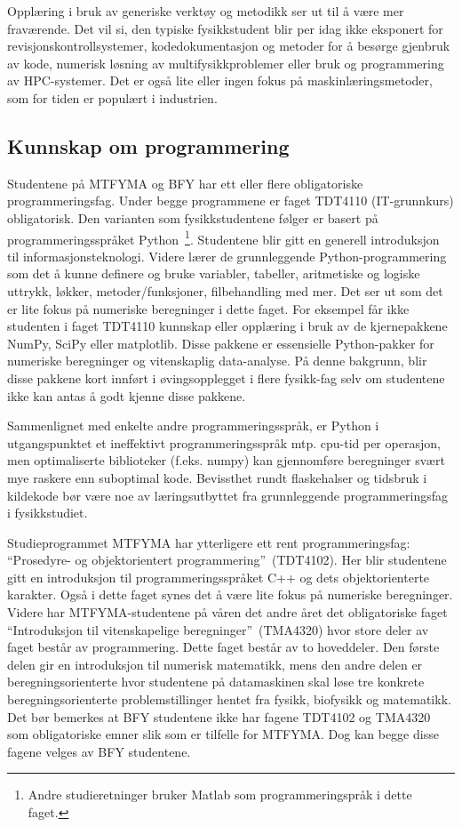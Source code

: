 \documentclass{article}
\begin{document}
Opplæring i bruk av generiske verktøy og metodikk ser ut til å være mer fraværende. Det vil si, den typiske fysikkstudent blir per idag ikke eksponert for revisjonskontrollsystemer, kodedokumentasjon og metoder for å besørge gjenbruk av kode, numerisk løsning av multifysikkproblemer eller bruk og programmering av HPC-systemer. Det er også lite eller ingen fokus på maskinlæringsmetoder, som for tiden er populært i industrien.

\subsection{Kunnskap om programmering}
\label{Sec:Programming}
Studentene på MTFYMA og BFY har ett eller flere obligatoriske programmeringsfag. Under begge programmene er faget TDT4110 (IT-grunnkurs) obligatorisk. Den varianten som fysikkstudentene følger er basert på programmeringsspråket Python~\footnote{Andre studieretninger bruker Matlab som programmeringspråk i dette faget.}. Studentene blir gitt en generell introduksjon til informasjonsteknologi. Videre lærer de grunnleggende Python-programmering som det å kunne definere og bruke variabler, tabeller, aritmetiske og logiske uttrykk, løkker, metoder/funksjoner, filbehandling med mer. Det ser ut som det er lite fokus på numeriske beregninger i dette faget. For eksempel får ikke studenten i faget TDT4110 kunnskap eller opplæring i bruk av de kjernepakkene NumPy, SciPy eller matplotlib. Disse pakkene er essensielle Python-pakker for numeriske beregninger og vitenskaplig data-analyse. På denne bakgrunn, blir disse pakkene kort innført i øvingsopplegget i flere fysikk-fag selv om studentene ikke kan antas å godt kjenne disse pakkene. 

{\color{red} Sammenlignet med enkelte andre programmeringsspråk, er Python i utgangspunktet et ineffektivt programmeringsspråk mtp. cpu-tid per operasjon, men optimaliserte biblioteker (f.eks. numpy) kan gjennomføre beregninger svært mye raskere enn suboptimal kode.
Bevissthet rundt flaskehalser og tidsbruk i kildekode bør være noe av læringsutbyttet fra grunnleggende programmeringsfag i fysikkstudiet.}

Studieprogrammet MTFYMA har ytterligere ett rent programmeringsfag: ``Prosedyre- og objektorientert programmering''~(TDT4102). Her blir studentene gitt en introduksjon til programmeringsspråket C++ og dets objektorienterte karakter. Også i dette faget synes det å være lite fokus på numeriske beregninger. Videre har MTFYMA-studentene på våren det andre året det obligatoriske faget ``Introduksjon til vitenskapelige beregninger''~(TMA4320) hvor store deler av faget består av programmering. Dette faget består av to hoveddeler. Den første delen gir en introduksjon til numerisk matematikk, mens den andre delen er beregningsorienterte hvor studentene på datamaskinen skal løse tre konkrete beregningsorienterte problemstillinger hentet fra fysikk, biofysikk og matematikk. Det bør bemerkes at BFY studentene ikke har fagene TDT4102 og TMA4320 som obligatoriske emner slik som er tilfelle for MTFYMA. Dog kan begge disse fagene velges av BFY studentene.
\end{document}
